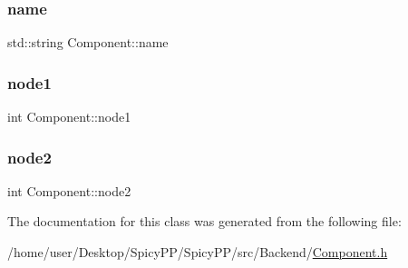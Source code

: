 \subsubsection{\texorpdfstring{name}{name}}
{\footnotesize\ttfamily std\+::string Component\+::name\hspace{0.3cm}{\ttfamily [private]}}

\mbox{\label{classComponent_a7d8cd23c0aaff5c139b825e77c0b2051}} 
\subsubsection{\texorpdfstring{node1}{node1}}
{\footnotesize\ttfamily int Component\+::node1\hspace{0.3cm}{\ttfamily [private]}}

\mbox{\label{classComponent_af96df64e1eb5fac7dae7c674cac3d31e}} 
\subsubsection{\texorpdfstring{node2}{node2}}
{\footnotesize\ttfamily int Component\+::node2\hspace{0.3cm}{\ttfamily [private]}}



The documentation for this class was generated from the following file\+:\begin{DoxyCompactItemize}
\item 
/home/user/\+Desktop/\+Spicy\+P\+P/\+Spicy\+P\+P/src/\+Backend/\hyperlink{Component_8h}{Component.\+h}\end{DoxyCompactItemize}
